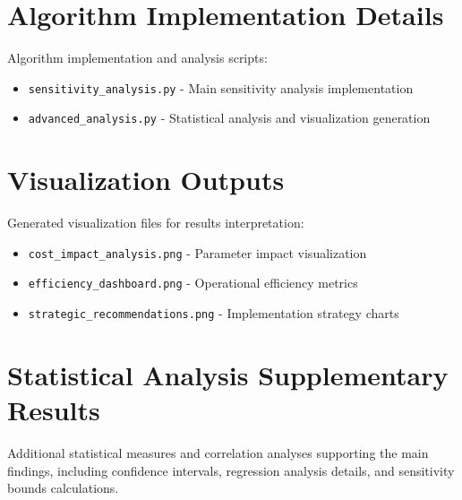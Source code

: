 \documentclass[12pt,a4paper]{article}
\begin{document}
\section{Algorithm Implementation Details}
\label{app:algorithm}
Algorithm implementation and analysis scripts:
\begin{itemize}
    \item \texttt{sensitivity\_analysis.py} - Main sensitivity analysis implementation
    \item \texttt{advanced\_analysis.py} - Statistical analysis and visualization generation
\end{itemize}

\section{Visualization Outputs}
\label{app:visualizations}
Generated visualization files for results interpretation:
\begin{itemize}
    \item \texttt{cost\_impact\_analysis.png} - Parameter impact visualization
    \item \texttt{efficiency\_dashboard.png} - Operational efficiency metrics
    \item \texttt{strategic\_recommendations.png} - Implementation strategy charts
\end{itemize}

\section{Statistical Analysis Supplementary Results}
\label{app:statistics}
Additional statistical measures and correlation analyses supporting the main findings, including confidence intervals, regression analysis details, and sensitivity bounds calculations.
\end{document}
